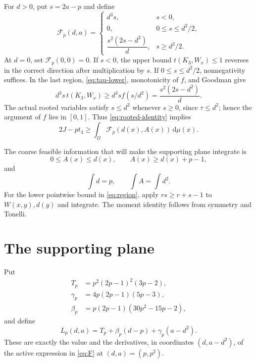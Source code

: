 \documentclass[11pt]{article}
\newcommand{\dd}{\,\mathrm d}
\begin{document}
For $d>0$, put $s=2a-p$ and define
\begin{equation}
 \mathcal F_p(d,a)=
 \begin{cases}
  d^3s,&s<0,\\[2pt]
  0,&0\le s\le d^2/2,\\[2pt]
  \dfrac{s^2(2s-d^2)}d,&s\ge d^2/2.
 \end{cases}
 \label{eq:F}
\end{equation}
At $d=0$, set $\mathcal F_p(0,0)=0$.  If $s<0$, the upper bound
$t(K_3,W_x)\le1$ reverses in the correct direction after multiplication by
$s$.  If $0\le s\le d^2/2$, nonnegativity suffices.  In the last region,
\eqref{eq:tau-lower}, monotonicity of $f$, and Goodman give
\[
 d^3s\,t(K_3,W_x)
 \ge d^3s f(s/d^2)
 =\frac{s^2(2s-d^2)}d.
\]
The actual rooted variables satisfy $s\le d^2$ whenever $s\ge0$, since
$\tau\le d^2$; hence the argument of $f$ lies in $[0,1]$.
Thus \eqref{eq:rooted-identity} implies
\begin{equation}
 2J-pt_4\ge\int_\Omega\mathcal F_p(d(x),A(x))\dd\mu(x).
 \label{eq:scalar-reduction}
\end{equation}

The coarse feasible information that will make the supporting plane
integrate is
\begin{equation}
 0\le A(x)\le d(x),
 \qquad A(x)\ge d(x)+p-1,
 \label{eq:region}
\end{equation}
and
\begin{equation}
 \int d=p,
 \qquad \int A=\int d^2.
 \label{eq:moments}
\end{equation}
For the lower pointwise bound in \eqref{eq:region}, apply
$rs\ge r+s-1$ to $W(x,y),d(y)$ and integrate.  The moment identity follows
from symmetry and Tonelli.


\section{The supporting plane}

Put
\begin{align}
 T_p&=p^2(2p-1)^2(3p-2),\label{eq:T}\\
 \gamma_p&=4p(2p-1)(5p-3),\label{eq:gamma}\\
 \beta_p&=p(2p-1)(30p^2-15p-2),\label{eq:beta}
\end{align}
and define
\begin{equation}
 L_p(d,a)=T_p+\beta_p(d-p)+\gamma_p(a-d^2).
 \label{eq:L}
\end{equation}
These are exactly the value and the derivatives, in coordinates
$(d,a-d^2)$, of the active expression in \eqref{eq:F} at
$(d,a)=(p,p^2)$.
\end{document}
